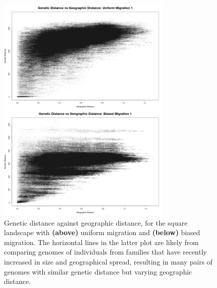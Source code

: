 \documentclass{article}
\begin{document}
\begin{figure}
\centering
     \includegraphics[width=0.75\textwidth]{figs/ibd_comp}
    \caption{
        Genetic distance against geographic distance,
        for the square landscape with 
        \textbf{(above)} uniform migration
        and \textbf{(below)} biased migration.
        The horizontal lines in the latter plot
        are likely from comparing genomes of individuals from
        families that have recently increased in size and geographical spread, 
        resulting in many pairs of genomes with similar genetic distance 
        but varying geographic distance.
    \label{fig:ibd_comp}
    }
\end{figure}
\end{document}
